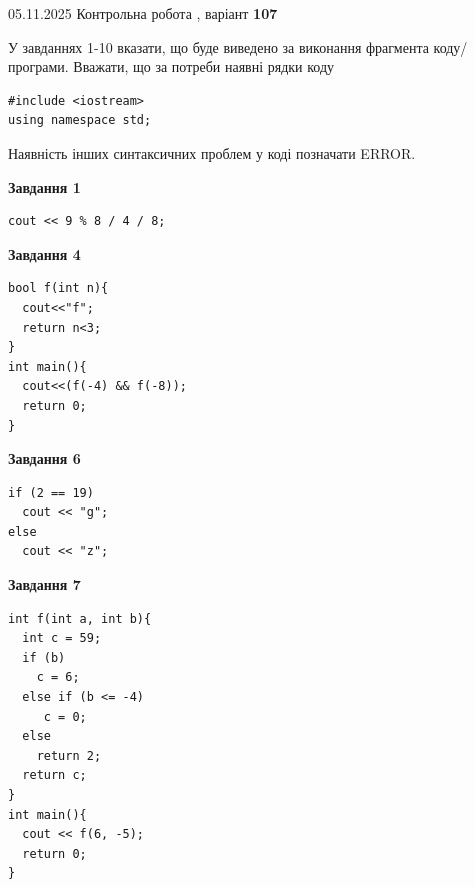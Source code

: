 \documentclass[12pt, ukrainian]{article}
\begin{document}
\newpage

{\Large{05.11.2025 Контрольна робота , варіант  \No \textbf { 107 }\par}}
{
\begin {large}
У завданнях 1-10 вказати, що буде виведено за виконання фрагмента коду/про\-гра\-ми.
Вважати, що за потреби наявні рядки коду
\begin{verbatim}
#include <iostream>
using namespace std;
\end{verbatim}
Наявність інших синтаксичних проблем у коді позначати ERROR.

\begin{minipage}[t]{7.0cm}

\begin{center}
\textbf{Завдання 1}
\end{center}
\vspace{-8mm}

\begin{verbatim}
cout << 9 % 8 / 4 / 8;
\end{verbatim}



\begin{center}
\textbf{Завдання 4}
\end{center}
\vspace{-8mm}

\begin{verbatim}
bool f(int n){
  cout<<"f";
  return n<3;
}
int main(){
  cout<<(f(-4) && f(-8));
  return 0;
}
\end{verbatim}



\begin{center}
\textbf{Завдання 6}
\end{center}
\vspace{-8mm}

\begin{verbatim}
if (2 == 19)
  cout << "g";
else
  cout << "z";
\end{verbatim}



\begin{center}
\textbf{Завдання 7}
\end{center}
\vspace{-8mm}

\begin{verbatim}
int f(int a, int b){
  int c = 59;
  if (b)
    c = 6;
  else if (b <= -4)
     c = 0;
  else
    return 2;
  return c;
}
int main(){
  cout << f(6, -5);
  return 0;
}
\end{verbatim}


\end{minipage}
\end{large}}
\end{document}
